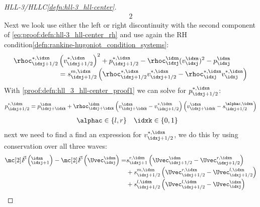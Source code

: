\begin{proofbox}
\begin{proof}[HLL-3/HLLC\cref{defn:hll-3_hll-center}]
\begin{alignat*}{2}
        \end{alignat*}
        Next we look use either the left or right discontinuity with the second component of \cref{eq:proof:defn:hll-3_hll-center_rh} and use again the
        RH condition\cref{defn:rankine-hugoniot_condition_systems}:
        \begin{align*}
          \rhoc_{\idxj+1/2}^{*,\idxn}&\left(v_{\idxj+1/2}^{*,\idxn}\right)^{2}+p_{\idxj+1/2}^{*,\idxn}-\rhoc_{\idxj}^{\idxn}(v_{\idxj}^{\idxn})^{2}-p_{\idxj}^{\idxn}\\[-1\jot]
          &=s_{\idxj+1/2}^{m,\idxn} \left(\rhoc_{\idxj+1/2}^{*,\idxn}v_{\idxj+1/2}^{*,\idxn}-\rhoc_{\idxj}^{*,\idxn}v_{\idxj}^{*,\idxn}\right)
        \end{align*}
        With \cref{proof:defn:hll_3_hll-center_proof1} we can solve for $p_{\idxj+1/2}^{*,\idxn}$:
        \begin{align*}
          p_{\idxj+1/2}^{*,\idxn}=p_{\idxj+\idxk}^{\idxn}+\rhoc_{\idxj+\idxk}^{\idxn}\left(v_{\idxj+\idxk}^{\idxn}-v_{\idxj+1/2}^{*,\idxn}\right)
          \left(v_{\idxj+\idxk}^{\idxn}-s_{\idxj+1/2}^{\alphac,\idxn}\right)
        \end{align*}
        \begin{align*}
          &\alphac\in\left\{l,r\right\}&&\idxk\in\left\{0,1\right\}
        \end{align*}
        next we need to find a find an expression for $v_{\idxj+1/2}^{*,\idxn}$, we do this by using conservation over all three waves:
        \begin{align*}
          \Fluxvec\left(_{\idxj+1}^{\idxn}\right)-\Fluxvec\left(\Uvec_{\idxj}^{\idxn}\right)=&
        s_{\idxj+1}^{r,\idxn}\left(\Uvec_{\idxj+1/2}^{\idxn}-\Uvec_{\idxj+1/2}^{r,\idxn}\right)\\[-1\jot]
        &+s_{\idxj+1/2}^{m,\idxn}\left(\Uvec_{\idxj+1/2}^{r,\idxn}-\Uvec_{\idxj+1/2}^{l,\idxn}\right)\\[-1\jot]
        &+s_{\idxj+1/2}^{l,\idxn}\left(\Uvec_{\idxj+1/2}^{l,\idxn}-\Uvec_{\idxj}^{\idxn}\right)
        \end{align*}
    \end{proof}
\end{proofbox}
